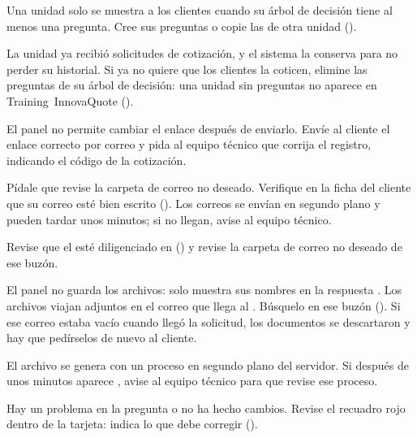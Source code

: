   {Una unidad solo se muestra a los clientes cuando su árbol de decisión tiene al menos una
   pregunta. Cree sus preguntas o copie las de otra unidad ().}

  {La unidad ya recibió solicitudes de cotización, y el sistema la conserva para no perder su
   historial. Si ya no quiere que los clientes la coticen, elimine las preguntas de su árbol de
   decisión: una unidad sin preguntas no aparece en Training~InnovaQuote ().}

  {El panel no permite cambiar el enlace después de enviarlo. Envíe al cliente el enlace
   correcto por correo y pida al equipo técnico que corrija el registro, indicando el código de
   la cotización.}

  {Pídale que revise la carpeta de correo no deseado. Verifique en la ficha del cliente que su
   correo esté bien escrito (). Los correos se envían en segundo plano y
   pueden tardar unos minutos; si no llegan, avise al equipo técnico.}

  {Revise que el  esté diligenciado en
    () y revise la carpeta de correo no
   deseado de ese buzón.}

  {El panel no guarda los archivos: solo muestra sus nombres en la respuesta . Los archivos viajan adjuntos en el correo  que llega al . Búsquelo en ese buzón
   (). Si ese correo estaba vacío cuando llegó la solicitud,
   los documentos se descartaron y hay que pedírselos de nuevo al cliente.}

  {El archivo se genera con un proceso en segundo plano del servidor. Si después de unos
   minutos aparece , avise al equipo técnico para
   que revise ese proceso.}

  {Hay un problema en la pregunta o no ha hecho cambios. Revise el recuadro rojo dentro de la
   tarjeta: indica lo que debe corregir ().}

